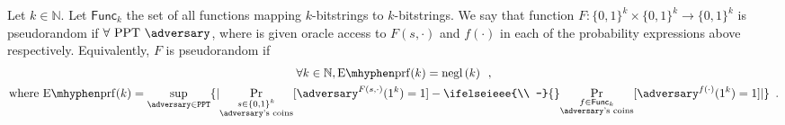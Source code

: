   \begin{definition}
    \label{def:prf:secure}
    Let $k \in \mathbb{N}$. Let $\mathsf{Func}_k$ the set of all functions
    mapping $k$-bitstrings to $k$-bitstrings. We say that function $F: \{0,
    1\}^k \times \{0, 1\}^k \rightarrow \{0, 1\}^k$ is pseudorandom if $\forall
    \text{ PPT } \adversary$,
    where \adversary{} is given oracle access to $F(s, \cdot)$ and $f(\cdot)$ in
    each of the probability expressions above respectively. Equivalently, $F$ is
    pseudorandom if
    \begin{gather*}
      \forall k \in \mathbb{N}, \mathrm{E \mhyphen prf}(k) =
      \mathrm{negl}\left(k\right) \enspace, \\
      \text{where } \mathrm{E \mhyphen prf}(k) = \underset{\adversary \in
      \mathtt{PPT}}{\sup}\{|\underset{\substack{s \in \{0, 1\}^k \\
      \adversary\text{'s coins}}}{\Pr}[\adversary^{F(s, \cdot)}(1^k) = 1] -
      \ifelseieee{\\ -}{}
      \underset{\substack{f \in \mathsf{Func}_k \\ \adversary\text{'s
      coins}}}{\Pr}[\adversary^{f(\cdot)}(1^k) = 1]|\} \enspace.
    \end{gather*}
  \end{definition}

